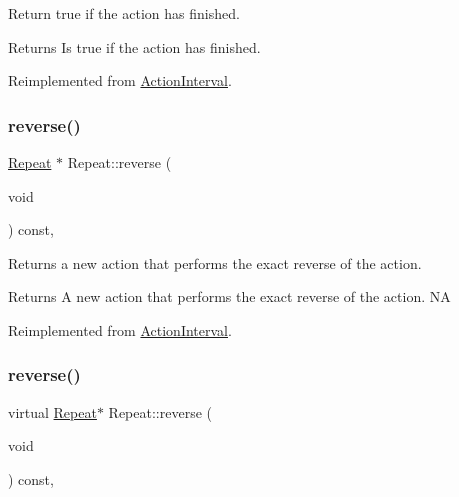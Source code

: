 Return true if the action has finished.

\begin{DoxyReturn}{Returns}
Is true if the action has finished. 
\end{DoxyReturn}


Reimplemented from \hyperlink{classActionInterval_a466ff6a3a5f95e47d4d01bfa4775290d}{Action\+Interval}.

\mbox{\label{classRepeat_ac20df5514656526699db17946a51279a}} 
\subsubsection{\texorpdfstring{reverse()}{reverse()}\hspace{0.1cm}{\footnotesize\ttfamily [1/2]}}
{\footnotesize\ttfamily \hyperlink{classRepeat}{Repeat} $\ast$ Repeat\+::reverse (\begin{DoxyParamCaption}\item[{void}]{ }\end{DoxyParamCaption}) const\hspace{0.3cm}{\ttfamily [override]}, {\ttfamily [virtual]}}

Returns a new action that performs the exact reverse of the action.

\begin{DoxyReturn}{Returns}
A new action that performs the exact reverse of the action.  NA 
\end{DoxyReturn}


Reimplemented from \hyperlink{classActionInterval_a9f9ac7164036a0bc261a72f62a2b2da7}{Action\+Interval}.

\mbox{\label{classRepeat_a8351085b890ce8ff15f8781b152df2e7}} 
\subsubsection{\texorpdfstring{reverse()}{reverse()}\hspace{0.1cm}{\footnotesize\ttfamily [2/2]}}
{\footnotesize\ttfamily virtual \hyperlink{classRepeat}{Repeat}$\ast$ Repeat\+::reverse (\begin{DoxyParamCaption}\item[{void}]{ }\end{DoxyParamCaption}) const\hspace{0.3cm}{\ttfamily [override]}, {\ttfamily [virtual]}}

